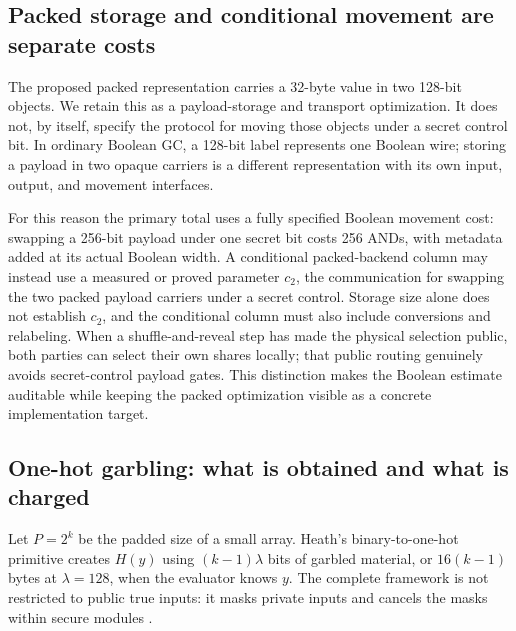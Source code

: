 \documentclass[11pt]{article}
\begin{document}
\subsection{Packed storage and conditional movement are separate costs}
The proposed packed representation carries a 32-byte value in two 128-bit
objects.  We retain this as a payload-storage and transport optimization.
It does not, by itself, specify the protocol for moving those objects under
a secret control bit.  In ordinary Boolean GC, a 128-bit label represents
one Boolean wire; storing a payload in two opaque carriers is a different
representation with its own input, output, and movement interfaces.

For this reason the primary total uses a fully specified Boolean movement
cost: swapping a 256-bit payload under one secret bit costs 256 ANDs, with
metadata added at its actual Boolean width.  A conditional packed-backend
column may instead use a measured or proved parameter $c_2$, the communication
for swapping the two packed payload carriers under a secret control.  Storage
size alone does not establish $c_2$, and the conditional column must also
include conversions and relabeling.  When a shuffle-and-reveal step has made
the physical selection public, both parties can select their own shares
locally; that public routing genuinely avoids secret-control payload gates.
This distinction makes the Boolean estimate auditable while keeping the
packed optimization visible as a concrete implementation target.

\subsection{One-hot garbling: what is obtained and what is charged}
Let $P=2^k$ be the padded size of a small array.  Heath's binary-to-one-hot
primitive creates $H(y)$ using $(k-1)\lambda$ bits of garbled material, or
$16(k-1)$ bytes at $\lambda=128$, when the evaluator knows $y$.
The complete framework is not restricted to public true inputs: it masks
private inputs and cancels the masks within secure modules
\cite{heath2021,heath2024}.
\end{document}
